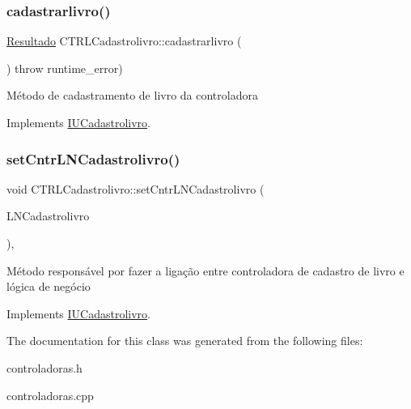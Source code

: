 \subsubsection{\texorpdfstring{cadastrarlivro()}{cadastrarlivro()}}
{\footnotesize\ttfamily \hyperlink{classResultado}{Resultado} C\+T\+R\+L\+Cadastrolivro\+::cadastrarlivro (\begin{DoxyParamCaption}{ }\end{DoxyParamCaption}) throw  runtime\+\_\+error) \hspace{0.3cm}{\ttfamily [virtual]}}

Método de cadastramento de livro da controladora 

Implements \hyperlink{classIUCadastrolivro}{I\+U\+Cadastrolivro}.

\mbox{\label{classCTRLCadastrolivro_a33a20d203d867a4dff37fe180b18acd4}} 
\subsubsection{\texorpdfstring{set\+Cntr\+L\+N\+Cadastrolivro()}{setCntrLNCadastrolivro()}}
{\footnotesize\ttfamily void C\+T\+R\+L\+Cadastrolivro\+::set\+Cntr\+L\+N\+Cadastrolivro (\begin{DoxyParamCaption}\item[{\hyperlink{classILNCadastrolivro}{I\+L\+N\+Cadastrolivro} $\ast$}]{L\+N\+Cadastrolivro }\end{DoxyParamCaption})\hspace{0.3cm}{\ttfamily [inline]}, {\ttfamily [virtual]}}

Método responsável por fazer a ligação entre controladora de cadastro de livro e lógica de negócio 

Implements \hyperlink{classIUCadastrolivro}{I\+U\+Cadastrolivro}.



The documentation for this class was generated from the following files\+:\begin{DoxyCompactItemize}
\item 
controladoras.\+h\item 
controladoras.\+cpp\end{DoxyCompactItemize}
